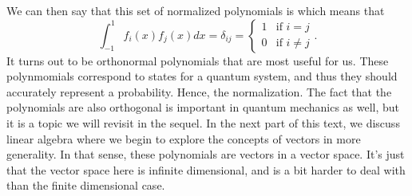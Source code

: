 We can then say that this set of normalized polynomials is  which means that
\[
\int_{-1}^1 f_i(x)f_j(x)dx = \delta_{ij} = \begin{cases} 1 & \textrm{if $i=j$}\\ 0 & \textrm{if $i\neq j$}\end{cases}.
\]
It turns out to be orthonormal polynomials that are most useful for us.  These polynmomials correspond to states for a quantum system, and thus they should accurately represent a probability. Hence, the normalization.  The fact that the polynomials are also orthogonal is important in quantum mechanics as well, but it is a topic we will revisit in the sequel. In the next part of this text, we discuss linear algebra where we begin to explore the concepts of vectors in more generality.  In that sense, these polynomials are vectors in a vector space.  It's just that the vector space here is infinite dimensional, and is a bit harder to deal with than the finite dimensional case.